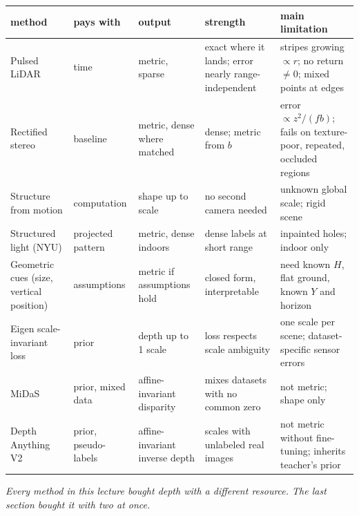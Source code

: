\documentclass[11pt,a4paper]{article}
\numberwithin{equation}{section}
\theoremstyle{plain}
\theoremstyle{definition}
\begin{document}
\begin{center}
\scriptsize
\begin{tabularx}{\linewidth}{@{}>{\raggedright\arraybackslash}p{2.6cm}>{\raggedright\arraybackslash}p{1.9cm}>{\raggedright\arraybackslash}p{1.7cm}YY@{}}
\toprule
method & pays with & output & strength & main limitation\\
\midrule
Pulsed LiDAR & time & metric, sparse & exact where it lands; error nearly range-independent & stripes growing $\propto r$; no return $\neq0$; mixed points at edges\\
Rectified stereo & baseline & metric, dense where matched & dense; metric from $b$ & error $\propto z^2/(fb)$; fails on texture-poor, repeated, occluded regions\\
Structure from motion & computation & shape up to scale & no second camera needed & unknown global scale; rigid scene\\
Structured light (NYU) & projected pattern & metric, dense indoors & dense labels at short range & inpainted holes; indoor only\\
Geometric cues (size, vertical position) & assumptions & metric if assumptions hold & closed form, interpretable & need known $H$, flat ground, known $Y$ and horizon\\
Eigen scale-invariant loss & prior & depth up to 1 scale & loss respects scale ambiguity & one scale per scene; dataset-specific sensor errors\\
MiDaS & prior, mixed data & affine-invariant disparity & mixes datasets with no common zero & not metric; shape only\\
Depth Anything V2 & prior, pseudo-labels & affine-invariant inverse depth & scales with unlabeled real images & not metric without fine-tuning; inherits teacher's prior\\
\bottomrule
\end{tabularx}
\end{center}

\vspace{1em}
\noindent %
\emph{Every method in this lecture bought depth with a different resource. The last section bought it with two at once.}
\end{document}
